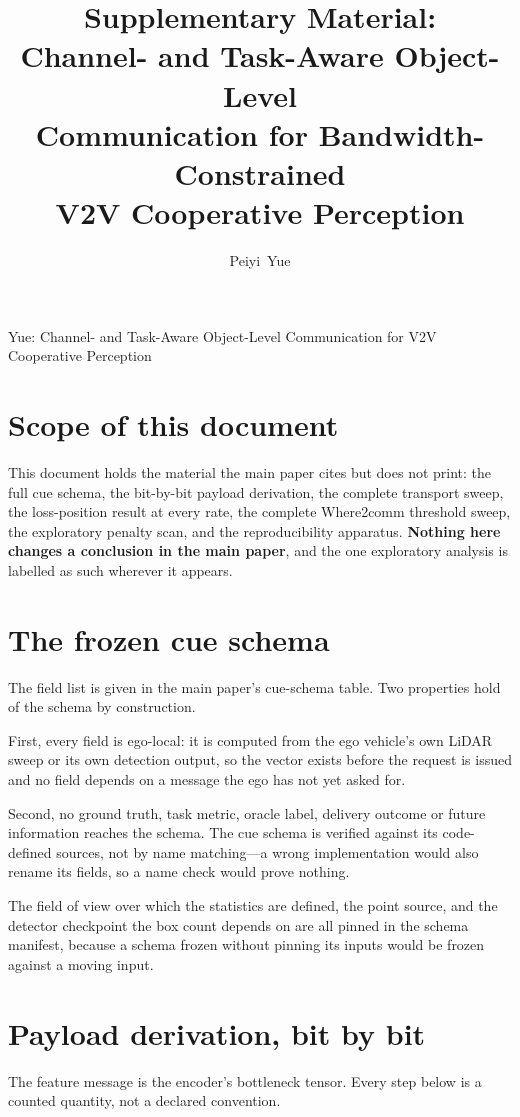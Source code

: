 \documentclass[journal]{IEEEtran}
\begin{document}
\title{Supplementary Material:\\Channel- and Task-Aware Object-Level\\Communication for Bandwidth-Constrained\\V2V Cooperative Perception}
\author{Peiyi~Yue}
{Yue: Channel- and Task-Aware Object-Level Communication for V2V Cooperative Perception}
\maketitle

\section{Scope of this document}
This document holds the material the main paper cites but does not print: the full cue schema, the
bit-by-bit payload derivation, the complete transport sweep, the loss-position result at every rate,
the complete Where2comm threshold sweep, the exploratory penalty scan, and the reproducibility
apparatus. \textbf{Nothing here changes a conclusion in the main paper}, and the one exploratory
analysis is labelled as such wherever it appears.

\section{The frozen cue schema}
The field list is given in the main paper's cue-schema table. Two properties hold of the schema by construction.

First, every field is ego-local: it is computed from the ego vehicle's own LiDAR sweep or its own
detection output, so the vector exists before the request is issued and no field depends on a
message the ego has not yet asked for.

Second, no ground truth, task metric, oracle label, delivery outcome or future information reaches
the schema. The cue schema is verified against its code-defined sources, not by name matching---a
wrong implementation would also rename its fields, so a name check would prove nothing.

The field of view over which the statistics are defined, the point source, and the detector
checkpoint the box count depends on are all pinned in the schema manifest, because a schema frozen
without pinning its inputs would be frozen against a moving input.

\section{Payload derivation, bit by bit}
The feature message is the encoder's bottleneck tensor. Every step below is a counted quantity, not
a declared convention.
\end{document}
